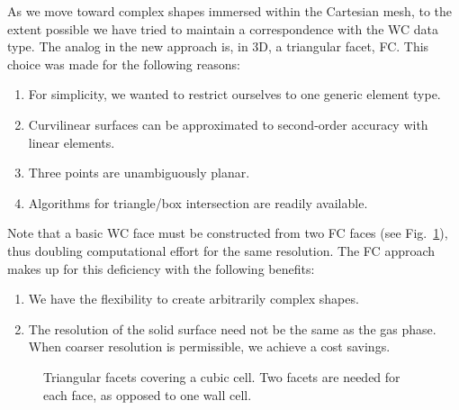 \documentclass[12pt]{article}
\begin{document}
As we move toward complex shapes immersed within the Cartesian mesh, to the extent possible we have tried to maintain a correspondence with the WC data type.  The analog in the new approach is, in 3D, a triangular facet, FC. This choice was made for the following reasons:
\begin{enumerate}[{\,\,\,\,(}a{)}]
\item For simplicity, we wanted to restrict ourselves to one generic element type.
\item Curvilinear surfaces can be approximated to second-order accuracy with linear elements.
\item Three points are unambiguously planar.
\item Algorithms for triangle/box intersection are readily available.
\end{enumerate}

Note that a basic WC face must be constructed from two FC faces (see Fig.~\ref{fig:facetcell}), thus doubling computational effort for the same resolution.  The FC approach makes up for this deficiency with the following benefits:
\begin{enumerate}[{(}i{)}]
\item We have the flexibility to create arbitrarily complex shapes.
\item The resolution of the solid surface need not be the same as the gas phase.  When coarser resolution is permissible, we achieve a cost savings.
\end{enumerate}


\begin{figure}
\begin{center}

\caption{Triangular facets covering a cubic cell.  Two facets are needed for each face, as opposed to one wall cell.}
\label{fig:facetcell}
\end{center}
\end{figure}
\end{document}
